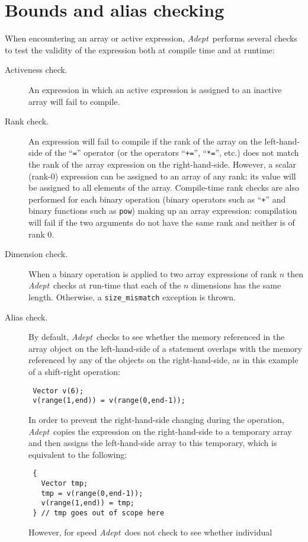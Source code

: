 \documentclass[a4,oneside]{book}
\def\codesize{\small}
\def\Adept{\emph{Adept}}
\def\code#1{{\codesize\texttt{#1}}}
\begin{document}
\section{Bounds and alias checking}
\label{sec:bounds}
When encountering an array or active expression, \Adept\ performs
several checks to test the validity of the expression both at compile
time and at runtime:
\begin{description}
\item[Activeness check.] An expression in which an active expression
  is assigned to an inactive array will fail to compile.
\item[Rank check.] An expression will fail to compile if the rank of
  the array on the left-hand-side of the ``\code{=}'' operator (or the
  operators ``\code{+=}'', ``\code{*=}'', etc.) does not match the
  rank of the array expression on the right-hand-side. However, a
  scalar (rank-0) expression can be assigned to an array of any rank;
  its value will be assigned to all elements of the
  array. Compile-time rank checks are also performed for each binary
  operation (binary operators such as ``\code{+}'' and binary
  functions such as \code{pow}) making up an array expression:
  compilation will fail if the two arguments do not have the same rank
  and neither is of rank 0.
\item[Dimension check.] When a binary operation is applied to two
  array expressions of rank $n$ then \Adept\ checks at run-time that
  each of the $n$ dimensions has the same length. Otherwise, a
  \code{size\_mismatch} exception is thrown.
\item[Alias check.] By default, \Adept\ checks to see whether the memory
  referenced in the array object on the left-hand-side of a statement
  overlaps with the memory referenced by any of the objects on the
  right-hand-side, as in this example of a shift-right operation:
\begin{lstlisting}
 Vector v(6);
 v(range(1,end)) = v(range(0,end-1));
\end{lstlisting}
  In order to prevent the right-hand-side changing during the
  operation, \Adept\ copies the expression on the right-hand-side to a
  temporary array and then assigns the left-hand-side array to this
  temporary, which is equivalent to the following:
\begin{lstlisting}
 {
   Vector tmp;
   tmp = v(range(0,end-1));
   v(range(1,end)) = tmp;
 } // tmp goes out of scope here
\end{lstlisting}
  However, for speed \Adept\ does not check to see whether individual

\end{description}
\end{document}
